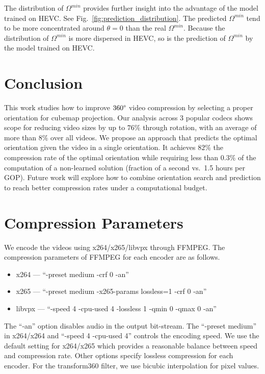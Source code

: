 \documentclass[journal,transmag]{IEEEtran}
\begin{document}
The distribution of $\Omega^{min}$ provides further insight into the advantage of the model trained on HEVC.
See Fig.~\ref{fig:prediction_distribution}.
The predicted $\Omega^{min}$ tend to be more concentrated around $\theta{=}0$ than the real $\Omega^{min}$.
Because the distribution of $\Omega^{min}$ is more dispersed in HEVC,
so is the prediction of $\Omega^{min}$ by the model trained on HEVC.



\section{Conclusion}


This work studies how to improve $360\degree$ video compression by selecting a proper orientation for cubemap projection.
Our analysis across 3 popular codecs shows scope for reducing video sizes by up to $76\%$ through rotation,
with an average of more than $8\%$ over all videos.
We propose an approach that predicts the optimal orientation given the video in a single orientation.
It achieves $82\%$ the compression rate of the optimal orientation while requiring less than $0.3\%$ of the computation of a non-learned solution (fraction of a second vs.~1.5 hours per GOP).
Future work will explore how to combine orientation search and prediction to reach better compression rates under a computational budget.






%
\IEEEpeerreviewmaketitle




\appendices
\section{Compression Parameters}

We encode the videos using x264/x265/libvpx through FFMPEG.
The compression parameters of FFMPEG for each encoder are as follows.
\begin{itemize}[leftmargin=*,label=$\bullet$]
    \item x264 --- ``-preset medium -crf 0 -an''
    \item x265 --- ``-preset medium -x265-params lossless=1 -crf 0 -an''
    \item libvpx --- ``-speed 4 -cpu-used 4 -lossless 1 -qmin 0 -qmax 0 -an''
\end{itemize}
The ``-an'' option disables audio in the output bit-stream.
The ``-preset medium'' in x264/x264 and ``-speed 4 -cpu-used 4'' controls the encoding speed.
We use the default setting for x264/x265 which provides a reasonable balance between speed and compression rate.
Other options specify lossless compression for each encoder.
For the transform360 filter,
we use bicubic interpolation for pixel values.
\end{document}
